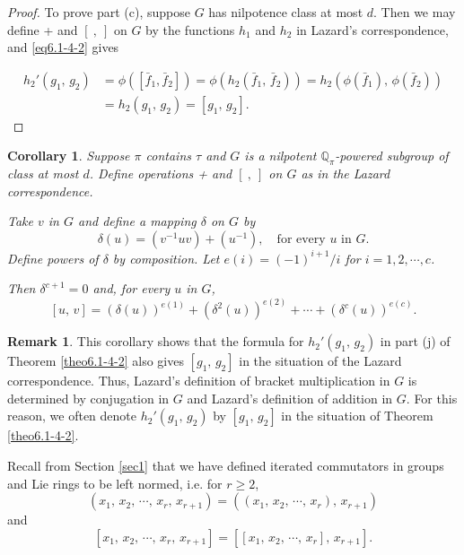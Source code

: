 \documentclass[mathscr]{amsart}
\theoremstyle{theorem}
\newtheorem{corollary}[theorem]{Corollary}
\theoremstyle{definition}
\newtheorem{remark}[theorem]{Remark}
\numberwithin{equation}{section}
\def \({\left(}
\def \){\right)}
\def\[{\left[}
\def\]{\right]}
\def\Q{\mathbb{Q}}
\begin{document}
\begin{proof}
To prove part (c), suppose $G$ has nilpotence class at most $d$.
Then we may define + and $[\ ,\ ]$ on $G$ by the functions $h_1$ and
$h_2$ in Lazard's correspondence, and \eqref{eq6.1-4-2} gives

\begin{equation*}
\begin{aligned}
h_2'(g_1,\, g_2)&= \phi\(\[\bar f_1,\bar f_2\]\)=\phi\(h_2\(\bar
f_1,\,\bar f_2\)\)=h_2\(\phi\(\bar f_1\),\,\phi\(\bar f_2\)\)\\
&=h_2(g_1,\,g_2)=\[g_1,\,g_2\].
\end{aligned}
\end{equation*}
\end{proof}

\begin{corollary}\label{cor6.2-4-2}
Suppose $\pi$ contains $\tau$ and $G$ is a nilpotent
$\Q_\pi$-powered subgroup of class at most $d$. Define operations +
and $[\ ,\ ]$ on $G$ as in the Lazard correspondence.

Take $v$ in $G$ and define a mapping $\delta$ on $G$ by
$$\delta(u)=\(v^{-1}uv\)+\(u^{-1}\),\quad\text{for every $u$ in $G$.}$$
Define powers of $\delta$ by composition. Let $e(i)=(-1)^{i+1}/i$
for $i=1,2,\cdots,c$.

Then $\delta^{c+1}=0$ and, for every $u$ in $G$,
$$[u,\,v]=\(\delta(u)\)^{e(1)}+\(\delta^2(u)\)^{e(2)}+\cdots+\(\delta^c(u)\)^{e(c)}.$$
\end{corollary}

\begin{remark}\label{rem6.3-4-2}
 This corollary shows that the formula for $h_2'(g_1,\,g_2)$ in part
 (j) of Theorem \ref{theo6.1-4-2} also gives $[g_1,\,g_2]$ in the
 situation of the Lazard correspondence. Thus, Lazard's definition
 of bracket multiplication in $G$ is determined by conjugation in
 $G$ and Lazard's definition of addition in $G.$ For this reason, we
 often denote $h_2'(g_1,\,g_2)$ by $[g_1,\,g_2]$ in the situation
 of Theorem \ref{theo6.1-4-2}.
 \end{remark}

Recall from Section \ref{sec1} that we have defined iterated
commutators in groups and Lie rings to be left normed, i.e. for
$r\geq2$,
$$\(x_1,\,x_2,\,\cdots,\,x_r,\,x_{r+1}\)=\(\(x_1,\,x_2,\,\cdots,\,x_r\),\,x_{r+1}\)$$
and
$$\[x_1,\,x_2,\,\cdots,\,x_r,\,x_{r+1}\]=\[\[x_1,\,x_2,\,\cdots,\,x_r\],\,x_{r+1}\].$$
\end{document}
